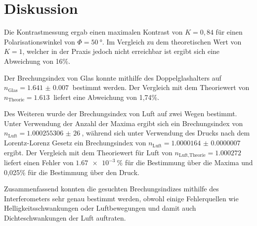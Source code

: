 \section{Diskussion}
\label{sec:Diskussion}
Die Kontrastmessung ergab einen maximalen Kontrast von $K=0,84$ für einen Polarisationswinkel von $\Phi=\SI{50}{\degree}$.
Im Vergleich zu dem theoretischen Wert von $K=1$, welcher in der Praxis jedoch nicht erreichbar ist ergibt sich eine
Abweichung von 16\%.

Der Brechungsindex von Glas konnte mithilfe des Doppelglashalters auf $n_\text{Glas}=\SI{1.641(7)}{}$ bestimmt werden.
Der Vergleich mit dem Theoriewert von $n_\text{Theorie}=\SI{1,613}{}$ liefert eine Abweichung von 1,74\%.

Des Weiteren wurde der Brechungsindex von Luft auf zwei Wegen bestimmt. Unter Verwendung der Anzahl der Maxima ergibt
sich ein Brechungsindex von $n_\text{Luft}=\SI{1,000255306(26)}{}$, während sich unter Verwendung des Drucks nach dem
Lorentz-Lorenz Gesetz ein Brechungsindex von $n_\text{Luft}=\SI{1.0000164(7)}{}$ ergibt.
Der Vergleich mit dem Theoriewert für Luft von $n_\text{Luft,Theorie}=\SI{1,000272}{}$ \cite{ns} liefert einen Fehler von
$\SI{1,67e-3}{}$\% für die Bestimmung über die Maxima und 0,025\% für die Bestimmung über den Druck.

Zusammenfassend konnten die gesuchten Brechungsindizes mithilfe des Interferometers sehr genau bestimmt werden, obwohl
einige Fehlerquellen wie Helligkeitsschwankungen oder Luftbewegungen und damit auch Dichteschwankungen der Luft auftraten.
